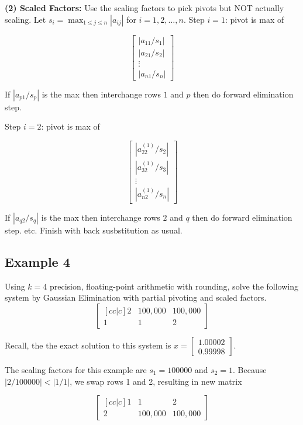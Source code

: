 \documentclass [titlepage,12pt,letter] {article}
\begin{document}
{\bf (2) Scaled Factors:}
Use the scaling factors to pick pivots but NOT actually scaling.
Let $s_i = \max_{1 \leq j \leq n} |a_{ij}|$ for $i=1,2,\dots, n$.
Step $i=1$: pivot is max of

\[
\begin{bmatrix}
  |a_{11}/s_1| \\
  |a_{21}/s_2| \\
  \vdots \\
  |a_{n1}/s_n| 
\end{bmatrix}
\]

If $|a_{p1}/s_p|$ is the max then interchange rows $1$ and $p$ then do forward elimination step.



Step $i=2$: pivot is max of

\[
\begin{bmatrix}
  |a_{22}^{(1)}/s_2| \\
  |a_{32}^{(1)}/s_3| \\
  \vdots \\
  |a_{n2}^{(1)}/s_n| 
\end{bmatrix}
\]

If $|a_{q2}/s_q|$ is the max then interchange rows $2$ and $q$ then do forward elimination step.
etc.
Finish with back susbstitution as usual.

\subsection{Example 4} Using $k=4$ precision, floating-point arithmetic with rounding, solve the following system by Gaussian Elimination with partial pivoting and scaled factors.
\[
\begin{bmatrix}[cc|c]
  2  &  100,000 & 100,000 \\
  1  &  1  &  2
\end{bmatrix}
\]

Recall, the the exact solution to this system is $x=\begin{bmatrix}1.00002 \\ 0.99998 \end{bmatrix}$. 

The scaling factors for this example are $s_1=100000$ and $s_2=1$. Because $|2/100000| < |1/1|$, we swap rows 1 and 2, resulting in new matrix

\[
\begin{bmatrix}[cc|c]
    1  &  1  &  2 \\
	2  &  100,000 & 100,000 
\end{bmatrix}
\]
\end{document}
